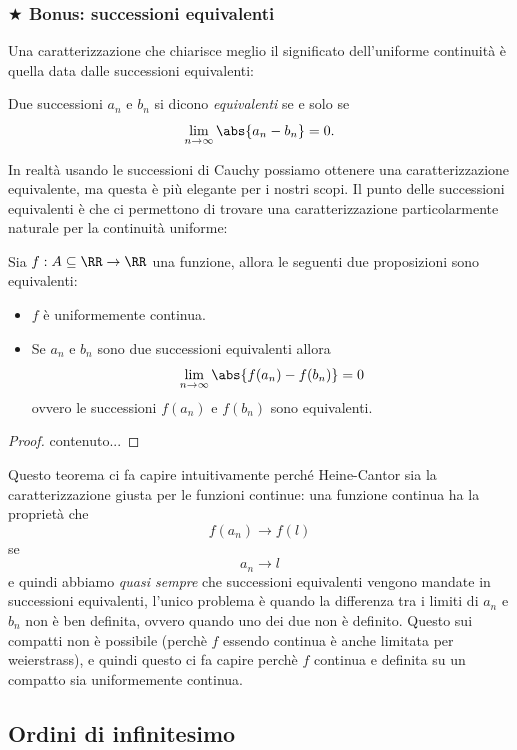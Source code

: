 \documentclass[11pt]{scrartcl}
\begin{document}
	\subsubsection{$\bigstar$ Bonus: successioni equivalenti}
	Una caratterizzazione che chiarisce meglio il significato dell'uniforme continuità è quella data dalle successioni equivalenti:
	\begin{definition}
		Due successioni $a_n$ e $b_n$ si dicono \textit{equivalenti} se e solo se
		$$\lim_{n\to \infty}\abs{a_n-b_n}=0.$$
	\end{definition}
	In realtà usando le successioni di Cauchy possiamo ottenere una caratterizzazione equivalente, ma questa è più elegante per i nostri scopi. Il punto delle successioni equivalenti è che ci permettono di trovare una caratterizzazione particolarmente naturale per la continuità uniforme:
	\begin{theorem}
		Sia $f:A\subseteq \RR\to \RR$ una funzione, allora le seguenti due proposizioni sono equivalenti:
		\begin{itemize}
			\item $f$ è uniformemente continua.
			\item Se $a_n$ e $b_n$ sono due successioni equivalenti allora 
			$$\lim_{n\to\infty}\abs{f(a_n)-f(b_n)}=0$$
			ovvero le successioni $f(a_n)$ e $f(b_n)$ sono equivalenti.
		\end{itemize}
	\end{theorem}
	\begin{proof}
		contenuto...
	\end{proof}
	Questo teorema ci fa capire intuitivamente perché Heine-Cantor sia la caratterizzazione giusta per le funzioni continue: una funzione continua ha la proprietà che 
	$$f(a_n)\to f(l)$$
	se
	$$a_n \to l$$
	e quindi abbiamo \textit{quasi sempre} che successioni equivalenti vengono mandate in successioni equivalenti, l'unico problema è quando la differenza tra i limiti di $a_n$ e $b_n$ non è ben definita, ovvero quando uno dei due non è definito. Questo sui compatti non è possibile (perchè $f$ essendo continua è anche limitata per weierstrass), e quindi questo ci fa capire perchè $f$ continua e definita su un compatto sia uniformemente continua.
	
	\subsection{Ordini di infinitesimo}
	
\end{document}
